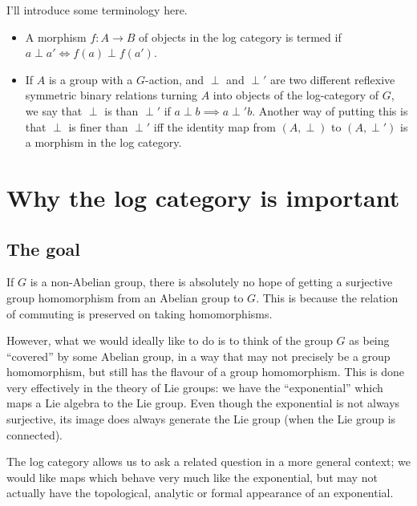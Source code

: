 \documentclass[a4paper]{amsart}
\begin{document}
I'll introduce some terminology here.

\begin{definer}
  \begin{itemize}

  \item A morphism $f:A \to B$ of objects in the log category is
    termed  if $a \perp a' \iff
    f(a) \perp f(a')$.

  \item If $A$ is a group with a $G$-action, and $\perp$ and $\perp'$
    are two different reflexive symmetric binary relations turning $A$
    into objects of the log-category of $G$, we say that $\perp$ is
     than $\perp'$ if $a \perp b \implies a \perp'
    b$. Another way of putting this is that $\perp$ is finer than
    $\perp'$ iff the identity map from $(A,\perp)$ to $(A,\perp')$ is
    a morphism in the log category.

  \end{itemize}
\end{definer}

\section{Why the log category is important}

\subsection{The goal}

If $G$ is a non-Abelian group, there is absolutely no hope of getting
a surjective group homomorphism from an Abelian group to $G$. This is because
the relation of commuting is preserved on taking homomorphisms.

However, what we would ideally like to do is to think of the group $G$
as being ``covered'' by some Abelian group, in a way that may not
precisely be a group homomorphism, but still has the flavour of a
group homomorphism. This is done very effectively in the theory of Lie
groups: we have the ``exponential'' which maps a Lie algebra to the
Lie group. Even though the exponential is not always surjective, its
image does always generate the Lie group (when the Lie group is
connected).

The log category allows us to ask a related question in a more general
context; we would like maps which behave very much like the
exponential, but may not actually have the topological, analytic or
formal appearance of an exponential.
\end{document}
